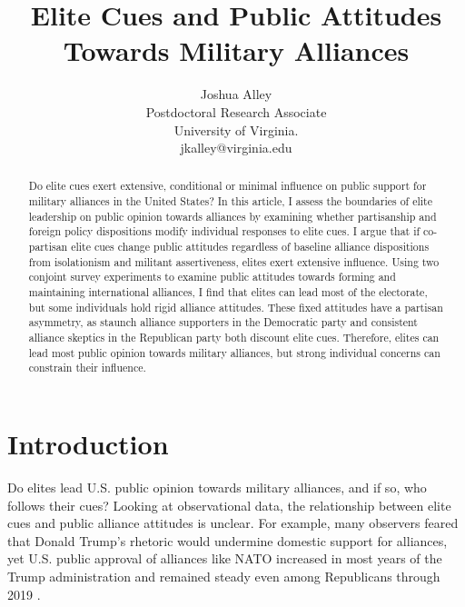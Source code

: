 \documentclass[12pt]{article}
\title{\textbf{Elite Cues and Public Attitudes Towards Military Alliances}}
\author{Joshua Alley \\
Postdoctoral Research Associate \\
University of Virginia. \\%
jkalley@virginia.edu
}
\date{}
\begin{document}
\maketitle 

\doublespace 

\begin{abstract}
Do elite cues exert extensive, conditional or minimal influence on public support for military alliances in the United States? 
In this article, I assess the boundaries of elite leadership on public opinion towards alliances by examining whether partisanship and foreign policy dispositions modify individual responses to elite cues.
I argue that if co-partisan elite cues change public attitudes regardless of baseline alliance dispositions from isolationism and militant assertiveness, elites exert extensive influence. 
Using two conjoint survey experiments to examine public attitudes towards forming and maintaining international alliances, I find that elites can lead most of the electorate, but some individuals hold rigid alliance attitudes. 
These fixed attitudes have a partisan asymmetry, as staunch alliance supporters in the Democratic party and consistent alliance skeptics in the Republican party both discount elite cues.  
Therefore, elites can lead most public opinion towards military alliances, but strong individual concerns can constrain their influence.  
\end{abstract}


\newpage 


\section{Introduction}


Do elites lead U.S. public opinion towards military alliances, and if so, who follows their cues?
Looking at observational data, the relationship between elite cues and public alliance attitudes is unclear.
For example, many observers feared that Donald Trump's rhetoric would undermine domestic support for alliances, yet U.S. public approval of alliances like NATO increased in most years of the Trump administration and remained steady even among Republicans through 2019 \citep{PewNATO2020}.
\end{document}
